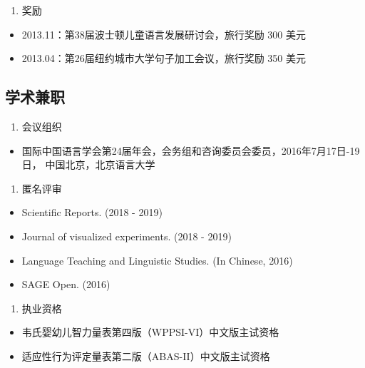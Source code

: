 \documentclass[12pt,]{article}
\providecommand{\tightlist}{%
  \setlength{\itemsep}{0pt}\setlength{\parskip}{0pt}}
\begin{document}
\begin{enumerate}
\def\labelenumi{\arabic{enumi}.}
\setcounter{enumi}{2}
\tightlist
\item
  奖励
\end{enumerate}

\begin{itemize}
\item
  2013.11：第38届波士顿儿童语言发展研讨会，旅行奖励 300 美元
\item
  2013.04：第26届纽约城市大学句子加工会议，旅行奖励 350 美元
\end{itemize}

\hypertarget{section-6}{%
\subsection{学术兼职}\label{section-6}}

\begin{enumerate}
\def\labelenumi{\arabic{enumi}.}
\tightlist
\item
  会议组织
\end{enumerate}

\begin{itemize}
\tightlist
\item
  国际中国语言学会第24届年会，会务组和咨询委员会委员，2016年7月17日-19日，
  中国北京，北京语言大学
\end{itemize}

\begin{enumerate}
\def\labelenumi{\arabic{enumi}.}
\setcounter{enumi}{1}
\tightlist
\item
  匿名评审
\end{enumerate}

\begin{itemize}
\tightlist
\item
  Scientific Reports. (2018 - 2019)
\item
  Journal of visualized experiments. (2018 - 2019)
\item
  Language Teaching and Linguistic Studies. (In Chinese, 2016)
\item
  SAGE Open. (2016)
\end{itemize}

\begin{enumerate}
\def\labelenumi{\arabic{enumi}.}
\setcounter{enumi}{2}
\tightlist
\item
  执业资格
\end{enumerate}

\begin{itemize}
\item
  韦氏婴幼儿智力量表第四版（WPPSI-VI）中文版主试资格
\item
  适应性行为评定量表第二版（ABAS-II）中文版主试资格
\end{itemize}
\end{document}
